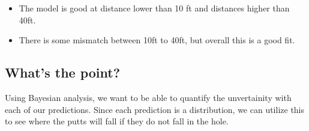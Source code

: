 \documentclass[11pt]{article}
\providecommand{\tightlist}{%
      \setlength{\itemsep}{0pt}\setlength{\parskip}{0pt}}
\begin{document}
\begin{itemize}
\tightlist
\item
  The model is good at distance lower than 10 ft and distances higher
  than 40ft.
\item
  There is some mismatch between 10ft to 40ft, but overall this is a
  good fit.
\end{itemize}

    \subsection{What's the point?}\label{whats-the-point}

    Using Bayesian analysis, we want to be able to quantify the unvertainity
with each of our predictions. Since each prediction is a distribution,
we can utilize this to see where the putts will fall if they do not fall
in the hole.
\end{document}
